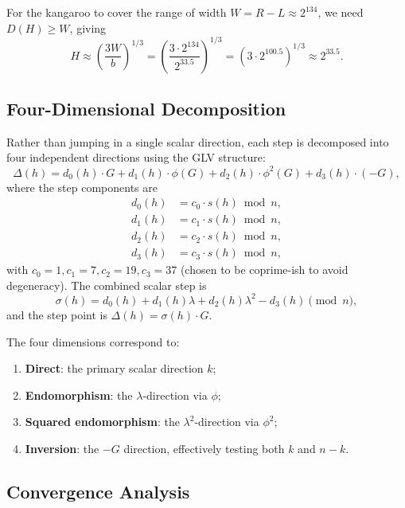 \documentclass[11pt,a4paper]{article}
\theoremstyle{definition}
\begin{document}
For the kangaroo to cover the range of width $W = R - L \approx 2^{134}$, we need $D(H) \geq W$, giving
\begin{equation}
H \approx \left(\frac{3W}{b}\right)^{1/3} = \left(\frac{3 \cdot 2^{134}}{2^{33.5}}\right)^{1/3} = \left(3 \cdot 2^{100.5}\right)^{1/3} \approx 2^{33.5}.
\end{equation}

\subsection{Four-Dimensional Decomposition}

Rather than jumping in a single scalar direction, each step is decomposed into four independent directions using the GLV structure:
\begin{equation}
\Delta(h) = d_0(h) \cdot G + d_1(h) \cdot \phi(G) + d_2(h) \cdot \phi^2(G) + d_3(h) \cdot (-G),
\end{equation}
where the step components are
\begin{align}
d_0(h) &= c_0 \cdot s(h) \bmod n, \\
d_1(h) &= c_1 \cdot s(h) \bmod n, \\
d_2(h) &= c_2 \cdot s(h) \bmod n, \\
d_3(h) &= c_3 \cdot s(h) \bmod n,
\end{align}
with $c_0 = 1, c_1 = 7, c_2 = 19, c_3 = 37$ (chosen to be coprime-ish to avoid degeneracy). The combined scalar step is
\begin{equation}
\sigma(h) = d_0(h) + d_1(h)\lambda + d_2(h)\lambda^2 - d_3(h) \pmod{n},
\end{equation}
and the step point is $\Delta(h) = \sigma(h) \cdot G$.

The four dimensions correspond to:
\begin{enumerate}
\item \textbf{Direct}: the primary scalar direction $k$;
\item \textbf{Endomorphism}: the $\lambda$-direction via $\phi$;
\item \textbf{Squared endomorphism}: the $\lambda^2$-direction via $\phi^2$;
\item \textbf{Inversion}: the $-G$ direction, effectively testing both $k$ and $n - k$.
\end{enumerate}

\subsection{Convergence Analysis}
\end{document}
